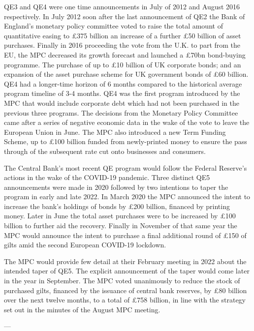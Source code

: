 QE3 and QE4 were one time announcements in July of 2012 and August 2016 respectively. In July 2012 soon after the last announcement of QE2 the Bank of England's monetary policy committee voted to raise the total amount of quantitative easing to £375 billion an increase of a further £50 billion of asset purchases. Finally in 2016 proceeding the vote from the U.K. to part from the EU, the MPC decreased its growth forecast and launched a £70bn bond-buying programme. The purchase of up to £10 billion of UK corporate bonds; and an expansion of the asset purchase scheme for UK government bonds of £60 billion. QE4 had a longer-time horizon of 6 months compared to the historical average program timeline of 3-4 months. QE4 was the first program introduced by the MPC that would include corporate debt which had not been purchased in the previous three programs. The decisions from the Monetary Policy Committee came after a series of negative economic data in the wake of the vote to leave the European Union in June. The MPC also introduced a new Term Funding Scheme, up to £100 billion funded from newly-printed money to ensure the pass through of the subsequent rate cut onto businesses and consumers.

The Central Bank's most recent QE program would follow the Federal Reserve's actions in the wake of the COVID-19 pandemic. Three distinct QE5 announcements were made in 2020 followed by two intentions to taper the program in early and late 2022. In March 2020 the MPC announced the intent to increase the bank's holdings of bonds by £200 billion, financed by printing money. Later in June the total asset purchases were to be increased by £100 billion to further aid the recovery. Finally in November of that same year the MPC would announce the intent to purchase a final additional round of £150 of gilts amid the second European COVID-19 lockdown.

The MPC would provide few detail at their February meeting in 2022 about the intended taper of QE5. The explicit announcement of the taper would come later in the year in September. The MPC voted unanimously to reduce the stock of purchased gilts, financed by the issuance of central bank reserves, by £80 billion over the next twelve months, to a total of £758 billion, in line with the strategy set out in the minutes of the August MPC meeting.


---
